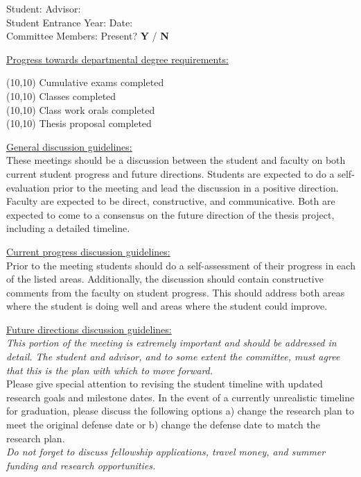 \documentclass[12pt,onecolumn]{article}
\newcommand*{\showline}[1][2]{\makebox[#1in]{\hrulefill}}
\begin{document}
{\large
Student: \showline[2.5] \hspace{20pt}
Advisor: \showline\\
Student Entrance Year: \showline[1.5] \hspace{20pt}
Date: \showline[1.5]\\
Committee Members: \showline[3]
Present? \textbf{Y} / \textbf{N}} \vspace{16pt}

{\large
\underline{Progress towards departmental degree requirements:}
\begin{multicols}{2}
\framebox(10,10){} Cumulative exams completed\\
\framebox(10,10){} Classes completed\\
\framebox(10,10){} Class work orals completed\\
\framebox(10,10){} Thesis proposal completed\\
\end{multicols}}

{\large \underline{General discussion guidelines:}}\\
These meetings should be a discussion between the student and faculty on both current student progress and future directions. Students are expected to do a self-evaluation prior to the meeting and lead the discussion in a positive direction. Faculty are expected to be direct, constructive, and communicative. Both are expected to come to a consensus on the future direction of the thesis project, including a detailed timeline.
\vspace{16pt}

{\large \underline{Current progress discussion guidelines:}}\\
Prior to the meeting students should do a self-assessment of their progress in each of the listed areas. Additionally, the discussion should contain constructive comments from the faculty on student progress. This should address both areas where the student is doing well and areas where the student could improve.
\vspace{16pt}

{\large \underline{Future directions discussion guidelines:}}\\
\textit{This portion of the meeting is extremely important and should be addressed in detail. The student and advisor, and to some extent the committee, must agree that this is the plan with which to move forward.}\\
Please give special attention to revising the student timeline 
with updated research goals and milestone dates. In the event of a currently unrealistic timeline for graduation, please discuss the following options a) change the research plan to meet the original defense date or b) change the defense date to match the research plan.\\
\textit{Do not forget to discuss fellowship applications, travel money, and summer funding and research opportunities.}
\vspace{16pt}
\end{document}
